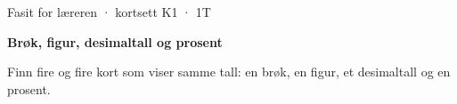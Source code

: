 \documentclass[11pt,a4paper]{article}
\begin{document}
\begin{minipage}[t]{0.8\linewidth}\vspace{0pt}
{\sffamily\small\color{dempet}Fasit for læreren · kortsett K1 · 1T}\par\vspace{0.25em}
{\fontsize{20}{24}\selectfont\bfseries Brøk, figur, desimaltall og prosent}\par\vspace{0.5em}
Finn fire og fire kort som viser samme tall: en brøk, en figur, et desimaltall og en prosent.\par{}
\end{minipage}\hfill
\begin{minipage}[t]{0.15\linewidth}\vspace{0pt}\raggedleft
{}
\end{minipage}\par\vspace{0.8em}
\end{document}
